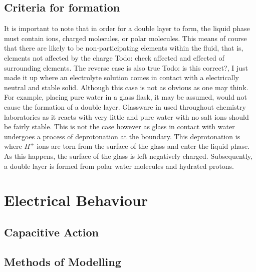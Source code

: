 \subsection{Criteria for formation}

    It is important to note that in order for a double layer to form, the liquid phase must contain ions, charged molecules, or polar molecules. This means of course that there are likely to be non-participating elements within the fluid, that is, elements not affected by the charge {Todo: check affected and effected} of surrounding elements.
    The reverse case is also true {Todo: is this correct?, I just made it up} where an electrolyte solution comes in contact with a electrically neutral and stable solid. Although this case is not as obvious as one may think. For example, placing pure water in a glass flask, it may be assumed, would not cause the formation of a double layer. Glassware in used throughout chemistry laboratories as it reacts with very little and pure water with no salt ions should be fairly stable. This is not the case however as glass in contact with water undergoes a process of deprotonation at the boundary. This deprotonation is where $H^{+}$ ions are torn from the surface of the glass and enter the liquid phase. As this happens, the surface of the glass is left negatively charged. Subsequently, a double layer is formed from polar water molecules and hydrated protons.


\section{Electrical Behaviour}

    \subsection{Capacitive Action}
    \subsection{Methods of Modelling}


